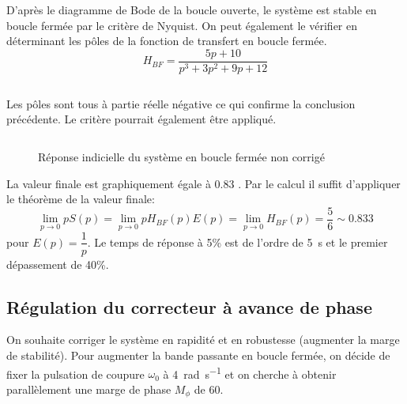 D'après le diagramme de Bode de la boucle ouverte, le système est stable 
en boucle fermée par le critère de Nyquist. On peut également le vérifier 
en déterminant les pôles de la fonction de transfert en boucle fermée.
\[
    H_{BF}=\dfrac{5p+10}{p^3+3p^2+9p+12}
\]
\inputminted{scilab}{scilab/code_q3_chap_correction.sce}
Les pôles sont tous à partie réelle négative ce qui confirme la conclusion 
précédente. Le critère pourrait également être appliqué.
\inputminted{scilab}{scilab/code_q4_chap_correction.sce}
\begin{figure}
    \centering
{}
    
    \caption{Réponse indicielle du système en boucle fermée non corrigé}
\end{figure}
La valeur finale est graphiquement égale à 0.83 .
Par le calcul il suffit d'appliquer le théorème de la valeur finale:
\[
    \lim\limits_{p\to0} pS(p)=
    \lim\limits_{p\to0} pH_{BF}(p)E(p)=
    \lim\limits_{p\to0} H_{BF}(p)=\dfrac{5}{6}\sim0.833
\]
pour $E(p)=\dfrac{1}{p}$.
Le temps de réponse à 5\% est de l'ordre de \SI{5}{\second} et le premier 
dépassement de 40\%.
\subsection*{Régulation du correcteur à avance de phase}
On souhaite corriger le système en rapidité et en robustesse (augmenter la 
marge de stabilité). Pour augmenter la bande passante en boucle fermée, on 
décide de fixer la pulsation de coupure $\omega_0$ à 
\SI{4}{\radian\per\second} et on cherche à obtenir parallèlement une marge 
de phase $M_\phi$ de \SI{60}{\degreeSI}.

